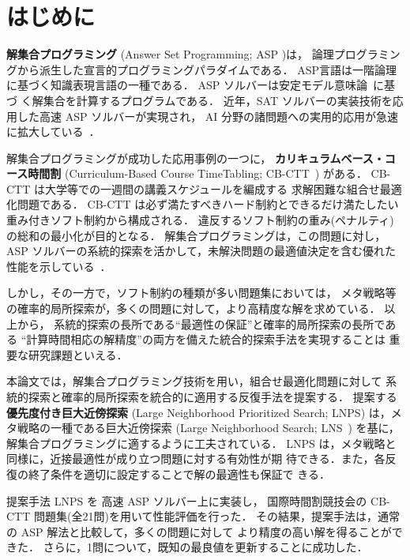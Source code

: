 \section{はじめに}

\textbf{解集合プログラミング}
(Answer Set Programming; ASP
\cite{%
  baral03:cambridge,%
  DBLP:conf/iclp/GelfondL88,%
  DBLP:journals/amai/Niemela99})は，
論理プログラミングから派生した宣言的プログラミングパラダイムである．
ASP言語は一階論理に基づく知識表現言語の一種である．
ASP ソルバーは安定モデル意味論~\cite{DBLP:conf/iclp/GelfondL88}に基づ
く解集合を計算するプログラムである．
近年，SAT ソルバーの実装技術を応用した高速 ASP ソルバーが実現され，
AI 分野の諸問題への実用的応用が急速に拡大している~\cite{ergele16a}．

解集合プログラミングが成功した応用事例の一つに，
\textbf{カリキュラムベース・コース時間割}
(Curriculum-Based Course TimeTabling; CB-CTT~\cite{DBLP:journals/anor/BonuttiCGS12})
がある．
CB-CTT は大学等での一週間の講義スケジュールを編成する
求解困難な組合せ最適化問題である．
CB-CTT は必ず満たすべきハード制約とできるだけ満たしたい
重み付きソフト制約から構成される．
違反するソフト制約の重み(ペナルティ)の総和の最小化が目的となる．
解集合プログラミングは，この問題に対し，
ASP ソルバーの系統的探索を活かして，未解決問題の最適値決定を含む優れた
性能を示している~\cite{anor/Banbara2019}．

しかし，その一方で，ソフト制約の種類が多い問題集においては，
メタ戦略等の確率的局所探索が，多くの問題に対して，より高精度な解を求めている．
以上から，
系統的探索の長所である``最適性の保証''と確率的局所探索の長所である
``計算時間相応の解精度''の両方を備えた統合的探索手法を実現することは
重要な研究課題といえる．

本論文では，解集合プログラミング技術を用い，組合せ最適化問題に対して
系統的探索と確率的局所探索を統合的に適用する反復手法を提案する．
%
提案する\textbf{優先度付き巨大近傍探索}
(Large Neighborhood Prioritized Search; LNPS)
は，メタ戦略の一種である巨大近傍探索
(Large Neighborhood Search; LNS~\cite{Pisinger10})
を基に，解集合プログラミングに適するように工夫されている．
LNPS は，メタ戦略と同様に，近接最適性が成り立つ問題に対する有効性が期
待できる．また，各反復の終了条件を適切に設定することで解の最適性も保証で
きる．


提案手法 LNPS を 高速 ASP ソルバー{\clingo}上に実装し，
国際時間割競技会の CB-CTT 問題集(全21問)を用いて性能評価を行った．
その結果，提案手法は，通常の ASP 解法と比較して，多くの問題に対して
より精度の高い解を得ることができた．
さらに，1問について，既知の最良値を更新することに成功した．

